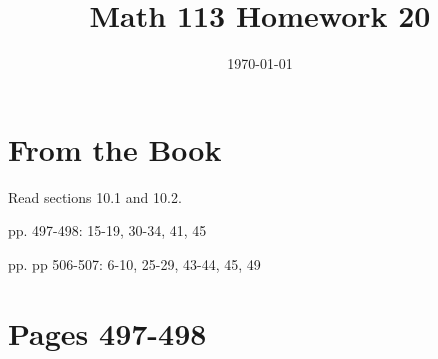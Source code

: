 \documentclass[fleqn,addpoints]{exam}
\title{Math 113 Homework 20}
\author{}
\date{\today}
\begin{document}
\maketitle

\section{From the Book}

Read sections 10.1 and 10.2.

\begin{itemize*}
  \item pp. 497-498: 15-19, 30-34, 41, 45
  \item pp. pp 506-507: 6-10, 25-29, 43-44, 45, 49
\end{itemize*}

\ifprintanswers
\section{Pages 497-498}
\end{document}
